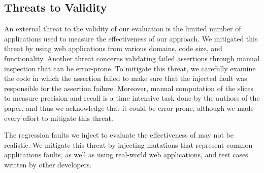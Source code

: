 \subsection{Threats to Validity} \label{Sec:threatsToValidity}
An external threat to the validity of our evaluation is the limited number of \javascript applications used to measure the effectiveness of our approach. We mitigated this threat by using web applications from various domains, code size, and functionality. Another threat concerns validating failed assertions through manual inspection that can be error-prone. To mitigate this threat, we carefully examine the code in which the assertion failed to make sure that the injected fault was responsible for the assertion failure. Moreover, manual computation of the \javascript slices to measure precision and recall is a time intensive task done by the authors of the paper, and thus we acknowledge that it could be error-prone, although we made every effort to mitigate this threat.

The regression faults we inject to evaluate the effectiveness of \tool may not be realistic. We mitigate this threat by injecting mutations that represent common \javascript applications faults, as well as using real-world web applications, and test cases written by other developers.